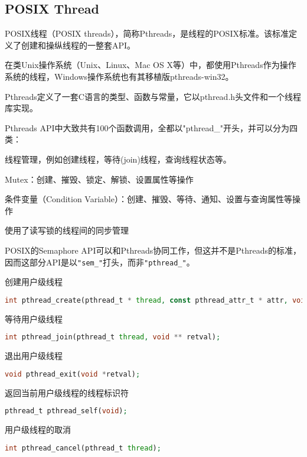 \subsection{POSIX Thread}

POSIX线程（POSIX threads），简称Pthreads，是线程的POSIX标准。该标准定义了创建和操纵线程的一整套API。


在类Unix操作系统（Unix、Linux、Mac OS X等）中，都使用Pthreads作为操作系统的线程，Windows操作系统也有其移植版pthreads-win32。

Pthreads定义了一套C语言的类型、函数与常量，它以pthread.h头文件和一个线程库实现。

Pthreads API中大致共有100个函数调用，全都以"pthread\_"开头，并可以分为四类：

\begin{compactitem}
\item 线程管理，例如创建线程，等待(join)线程，查询线程状态等。
\item Mutex：创建、摧毁、锁定、解锁、设置属性等操作
\item 条件变量（Condition Variable）：创建、摧毁、等待、通知、设置与查询属性等操作
\item 使用了读写锁的线程间的同步管理
\end{compactitem}

POSIX的Semaphore API可以和Pthreads协同工作，但这并不是Pthreads的标准，因而这部分API是以\texttt{"sem\_"}打头，而非\texttt{"pthread\_"}。



\begin{compactitem}
\item 创建用户级线程

\begin{lstlisting}[language=PHP]
int pthread_create(pthread_t * thread, const pthread_attr_t * attr, void *(*start_routine)(void *), void *arg);
\end{lstlisting}

\item 等待用户级线程

\begin{lstlisting}[language=PHP]
int pthread_join(pthread_t thread, void ** retval);
\end{lstlisting}

\item 退出用户级线程

\begin{lstlisting}[language=PHP]
void pthread_exit(void *retval);
\end{lstlisting}

\item 返回当前用户级线程的线程标识符

\begin{lstlisting}[language=PHP]
pthread_t pthread_self(void);
\end{lstlisting}

\item 用户级线程的取消

\begin{lstlisting}[language=PHP]
int pthread_cancel(pthread_t thread);
\end{lstlisting}

\end{compactitem}


